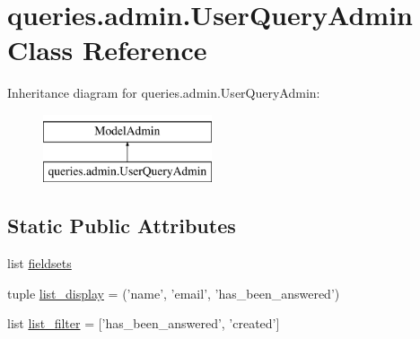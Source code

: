 \hypertarget{classqueries_1_1admin_1_1_user_query_admin}{\section{queries.\-admin.\-User\-Query\-Admin Class Reference}
\label{classqueries_1_1admin_1_1_user_query_admin}
}
Inheritance diagram for queries.\-admin.\-User\-Query\-Admin\-:\begin{figure}[H]
\begin{center}
\leavevmode
\includegraphics[height=2.000000cm]{classqueries_1_1admin_1_1_user_query_admin}
\end{center}
\end{figure}
\subsection*{Static Public Attributes}
\begin{DoxyCompactItemize}
\item 
list \hyperlink{classqueries_1_1admin_1_1_user_query_admin_a369ffda8f3363d028b542c32f295d82a}{fieldsets}
\item 
tuple \hyperlink{classqueries_1_1admin_1_1_user_query_admin_abe549c6c0f4a01da2772a23a03758521}{list\-\_\-display} = ('name', 'email', 'has\-\_\-been\-\_\-answered')
\item 
list \hyperlink{classqueries_1_1admin_1_1_user_query_admin_a34dc6e73185a2e292bd05e34e42536cb}{list\-\_\-filter} = \mbox{[}'has\-\_\-been\-\_\-answered', 'created'\mbox{]}
\end{DoxyCompactItemize}


